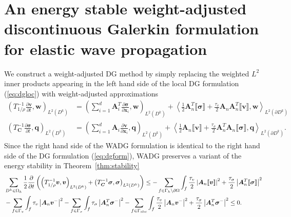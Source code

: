 \documentclass{siamart0216}
\newcommand{\pd}[2]{\frac{\partial#1}{\partial#2}}
\newcommand{\LRp}[1]{\left( #1 \right)}
\newcommand{\LRa}[1]{\left\langle #1 \right\rangle}
\newcommand{\LRb}[1]{\left| #1 \right|}
\newcommand{\jump}[1] {\ensuremath{\llbracket#1\rrbracket}}
\newcommand{\Oh}{{\Omega_h}}
\newcommand{\Lk}{L^2\LRp{D^k}}
\newcommand{\Ldk}{L^2\LRp{\partial D^k}}
\begin{document}
\section{An energy stable weight-adjusted discontinuous Galerkin formulation for elastic wave propagation}
\label{sec:wadgelas}
We construct a weight-adjusted DG method by simply replacing the weighted $L^2$ inner products appearing in the left hand side of the local DG formulation (\ref{eq:dgloc}) with weight-adjusted approximations
\begin{align*}
\LRp{T^{-1}_{1/\rho} \pd{\bm{v}}{t},\bm{w}}_{\Lk} &= \LRp{ \sum_{i=1}^d \bm{A}_i^T\pd{\bm{\sigma}}{\bm{x}_i},\bm{w}}_{\Lk}  + \LRa{\frac{1}{2}\bm{A}_n^T\jump{\bm{\sigma}} + \frac{\tau_v}{2}\bm{A}_n\bm{A}_n^T\jump{\bm{v}},\bm{w}}_{\Ldk}\\
\LRp{T^{-1}_{\bm{C}} \pd{\bm{\sigma}}{t},\bm{q}}_{\Lk} &= \LRp{\sum_{i=1}^d \bm{A}_i \pd{\bm{v}}{\bm{x}_i},\bm{q}}_{\Lk} + \LRa{\frac{1}{2}\bm{A}_n\jump{\bm{v}} + \frac{\tau_{\sigma}}{2}\bm{A}_n^T\bm{A}_n\jump{\bm{\sigma}},\bm{q}}_{\Ldk}.
\end{align*}
Since the right hand side of the WADG formulation is identical to the right hand side of the DG formulation (\ref{eq:dgform}), WADG preserves a variant of the energy stability in Theorem~\ref{thm:stability}  
\begin{align*}
&\sum_{D^k\in \Oh} \frac{1}{2}\pd{}{t}\LRp{\LRp{T^{-1}_{1/\rho} \bm{v},\bm{v}}_{\Lk} + \LRp{T^{-1}_{\bm{C}} \bm{\sigma},\bm{\sigma}}_{\Lk}} \leq - \sum_{f \in\Gamma_h \setminus \partial \Omega} \int_{f} \frac{\tau_v}{2}\LRb{\bm{A}_n\jump{\bm{v}}}^2 + \frac{\tau_\sigma}{2}\LRb{\bm{A}_n^T\jump{\bm{\sigma}}}^2\nonumber\\
& - \sum_{f\in \Gamma_v} \int_f \tau_v  \LRb{\bm{A}_n\bm{v}^-}^2  - \sum_{f\in \Gamma_\sigma} \int_f \tau_\sigma  \LRb{\bm{A}_n^T\bm{\sigma}^-}^2- \sum_{f\in \Gamma_{\rm abc}} \int_f \frac{\tau_v}{2} \LRb{\bm{A}_n\bm{v}^-}^2 + \frac{\tau_\sigma}{2} \LRb{\bm{A}_n^T\bm{\sigma}^-}^2 \leq 0.  
\end{align*}
\end{document}
